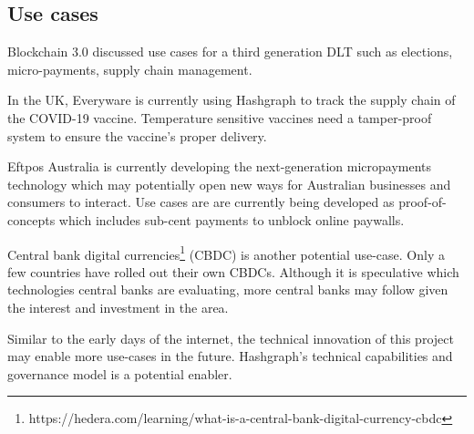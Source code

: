 

\subsection{Use cases}

Blockchain 3.0\cite{maesa2020blockchain} discussed use cases for a third generation DLT such as elections, micro-payments, supply chain management.

In the UK, Everyware is currently using Hashgraph to track the supply chain of the COVID-19 vaccine\cite{ryan2021}. Temperature sensitive vaccines need a tamper-proof system to ensure the vaccine's proper delivery.

Eftpos Australia is currently developing the next-generation micropayments technology which may potentially open new ways for Australian businesses and consumers to interact. Use cases are are currently being developed as proof-of-concepts which includes sub-cent payments to unblock online paywalls\cite{eftpos2021}.

Central bank digital currencies\footnote{https://hedera.com/learning/what-is-a-central-bank-digital-currency-cbdc} (CBDC) is another potential use-case. Only a few countries have rolled out their own CBDCs. Although it is speculative which technologies central banks are evaluating, more central banks may follow given the interest and investment in the area. 

Similar to the early days of the internet, the technical innovation of this project may enable more use-cases in the future. Hashgraph's technical capabilities and governance model is a potential enabler.




